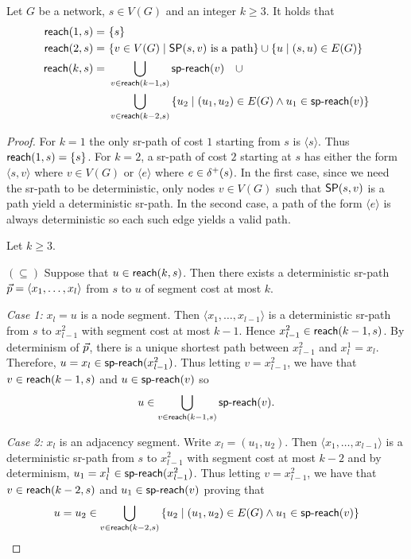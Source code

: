 \begin{theorem}
\label{thm:nreach}
Let $G$ be a network, $s \in V(G)$ and an integer $k \geq 3$. It holds that
\begin{align*}
\nreach(1, s) = & \ \{ s \} \\
\nreach(2, s) = & \ \{ v \in V(G) \mid  \sp(s, v) \textrm{ is a path} \} \cup \{ u \mid (s, u) \in E(G) \} \\
\nreach(k, s) = & \ \bigcup_{v \in \nreach(k - 1, s)} \spreach(v) \quad \cup \\ 
& \ \bigcup_{v \in \nreach(k - 2, s)}  \left\{ u_2 \mid (u_1, u_2) \in E(G) \wedge u_1 \in \spreach(v) \right\}
\end{align*}
\end{theorem}

\begin{proof}
For $k = 1$ the only sr-path of cost $1$ starting from $s$ is $\langle s \rangle$. Thus $\nreach(1, s) = \{ s \}$.
For $k = 2$, a sr-path of cost $2$ starting at $s$ has either the form $\langle s, v \rangle$ where
$v \in V(G)$ or $\langle e \rangle$ where $e \in \oute(s)$. In the first case, since we need the sr-path to
be deterministic, only nodes $v \in V(G)$ such that $\sp(s, v)$ is a path yield a deterministic sr-path. In the second case,
a path of the form $\langle e \rangle$ is always deterministic so each such edge yields a valid path.

Let $k \geq 3$. 

$(\subseteq)$ Suppose that $u \in \nreach(k, s)$. Then there exists a deterministic sr-path 
$\sr{p} = \langle x_1, \ldots, x_l \rangle$ from $s$ to $u$ of segment cost at most $k$.

\emph{Case 1:} $x_l = u$ is a node segment.
Then $\langle x_1, \ldots, x_{l - 1} \rangle$ is a deterministic
sr-path from $s$ to $x^2_{l - 1}$ with segment cost at most $k - 1$. Hence $x^2_{l - 1} \in \nreach(k - 1, s)$. By determinism of $\sr{p}$, there is a unique shortest path
between $x^2_{l - 1}$ and $x^1_l = x_l$. Therefore, $u = x_l \in \spreach(x^2_{l - 1})$. Thus letting $v = x^2_{l - 1}$, we have that
$v \in \nreach(k - 1, s)$ and $u \in \spreach(v)$ so
$$
u \in \bigcup_{v \in \nreach(k - 1, s)} \spreach(v).
$$

\emph{Case 2:} $x_l$ is an adjacency segment.
Write $x_l = (u_1, u_2)$. Then $\langle x_1, \ldots, x_{l - 1} \rangle$ is a deterministic sr-path 
from $s$ to $x^2_{l - 1}$ with segment cost at most $k - 2$ and by determinism, 
$u_1 = x^1_l \in \spreach(x^2_{l - 1})$. Thus letting $v = x^2_{l - 1}$,
we have that $v \in \nreach(k - 2, s)$ and $u_1 \in \spreach(v)$ proving that
$$
u = u_2 \in \bigcup_{v \in \nreach(k - 2, s)}  \left\{ u_2 \mid (u_1, u_2) \in E(G) \wedge u_1 \in \spreach(v) \right\}
$$


\end{proof}
